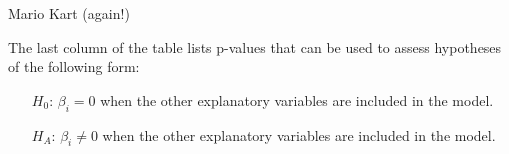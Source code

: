 \documentclass[12pt,a4paper]{beamer}
\begin{document}
	\begin{frame}{Mario Kart (again!)}
		\begin{table}[ht]
		\end{table}
	\small	The last column of the table lists p-values that can be used to assess hypotheses of the following form:
		\begin{itemize}
		\setlength{\itemsep}{0mm}
		\item[$H_0$:] $\beta_i = 0$ when the other explanatory variables are included in the model.
		\item[$H_A$:] $\beta_i \neq 0$ when the other explanatory variables are included in the model.
		\end{itemize}
	\end{frame}
\end{document}
